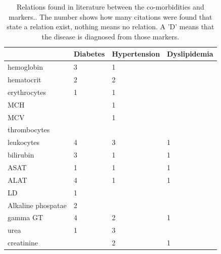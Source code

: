 \documentclass[10pt,a4paper]{article}
\begin{document}
	\begin{table}[]
		\centering
		\caption{Relations found in literature between the co-morbidities and markers.\cite{Deneer2017Thesis}. The number shows how many citations were found that state a relation exist, nothing means no relation. A 'D' means that the disease is diagnosed from those markers.}
		\label{tab:CoMorMarkRel}
		\begin{tabular}{llll}
			\hline
			& \textbf{Diabetes} & \textbf{Hypertension} & \textbf{Dyslipidemia} \\ \hline
			hemoglobin            & 3                 & 1                     &                       \\
			hematocrit            & 2                 & 2                     &                       \\
			erythrocytes          & 1                 & 1                     &                       \\
			MCH                   &                   & 1                     &                       \\
			MCV                   &                   & 1                     &                       \\
			thrombocytes          &                   &                       &                       \\
			leukocytes            & 4                 & 3                     & 1                     \\
			bilirubin             & 3                 & 1                     & 1                     \\
			ASAT                  & 1                 & 1                     & 1                     \\
			ALAT                  & 4                 & 1                     & 1                     \\
			LD                    & 1                 &                       &                       \\
			Alkaline phospatae    & 2                 &                       &                       \\
			gamma GT              & 4                 & 2                     & 1                     \\
			urea                  & 1                 & 3                     &                       \\
			creatinine            &                   & 2                     & 1                     \\

\end{tabular}
\end{table}
\end{document}
